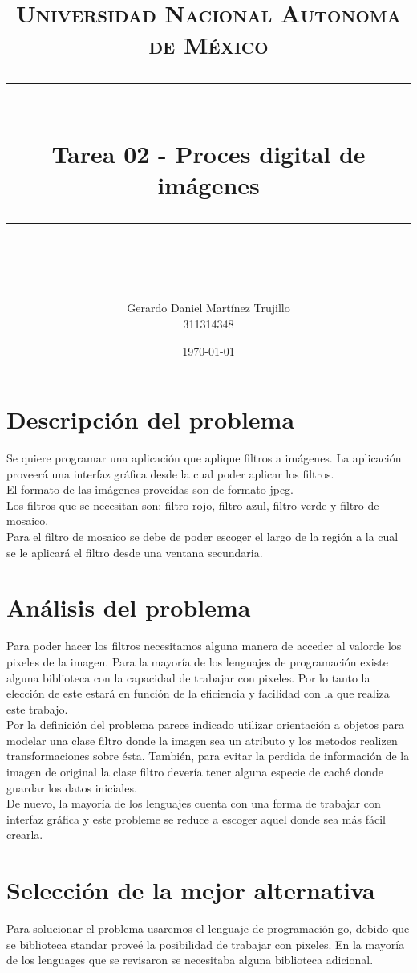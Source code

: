 \documentclass[11pt]{article}
\title{
        \normalfont\normalsize
        \textsc{Universidad Nacional Autonoma de México}\\
        \vspace{20pt}
        \rule{\linewidth}{0.5pt}\\
        \vspace{20pt}
        {\huge Tarea 02 - Proces digital de imágenes}\\
        \vspace{12pt}
        \rule{\linewidth}{2pt}\\
        \vspace{12pt}
}
\author{\LARGE Gerardo Daniel Martínez Trujillo \\ 311314348}
\date{\normalsize\today}
\begin{document}
\maketitle

\section{Descripción del problema}
Se quiere programar una aplicación que aplique filtros a imágenes. La
aplicación proveerá una interfaz gráfica desde la cual poder aplicar
los filtros.\\
El formato de las imágenes proveídas son de formato jpeg.\\

Los filtros que se necesitan son: filtro rojo, filtro azul, filtro
verde y filtro de mosaico.\\

Para el filtro de mosaico se debe de poder escoger el largo de la
región a la cual se le aplicará el filtro desde una ventana
secundaria.\\

\section{Análisis del problema}
Para poder hacer los filtros necesitamos alguna manera de acceder al
valorde los pixeles de la imagen. Para la mayoría de los lenguajes de
programación existe alguna biblioteca con la capacidad de trabajar con
pixeles. Por lo tanto la elección de este estará en función de la
eficiencia y facilidad con la que realiza este trabajo.\\

Por la definición del problema parece indicado utilizar orientación a
objetos para modelar una clase filtro donde la imagen sea un atributo
y los metodos realizen transformaciones sobre ésta. También, para
evitar la perdida de información de la imagen de original la clase
filtro devería tener alguna especie de caché donde guardar los datos
iniciales.\\

De nuevo, la mayoría de los lenguajes cuenta con una forma de trabajar
con interfaz gráfica y este probleme se reduce a escoger aquel donde
sea más fácil crearla.\\

\section{Selección de la mejor alternativa}
Para solucionar el problema usaremos el lenguaje de programación go,
debido que se biblioteca standar proveé la posibilidad de trabajar con
pixeles. En la mayoría de los lenguages que se revisaron se necesitaba
alguna biblioteca adicional.\\
\end{document}
